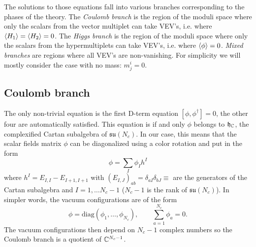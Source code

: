     The solutions to those equations fall into various branches corresponding to the phases of the theory. The \emph{Coulomb branch} is the region of the moduli space where only the scalars from the vector multiplet can take VEV's, i.e. where $\langle H_1\rangle=\langle H_2\rangle=0$. The \emph{Higgs branch} is the region of the moduli space where only the scalars from the hypermultiplets can take VEV's, i.e. where $\langle\phi\rangle=0$. \emph{Mixed branches} are regions where all VEV's are non-vanishing. For simplicity we will mostly consider the case with no mass: $m^i_j=0$.

    \subsection{Coulomb branch}

        The only non-trivial equation is the first D-term equation $[\phi,\phi^\dagger]=0$, the other four are automatically satisfied. This equation is if and only $\phi$ belongs to $\mathfrak{h}_{\mathbb{C}}$, the complexified Cartan subalgebra of $\mathfrak{su}(N_c)$. In our case, this means that the scalar fields matrix $\phi$ can be diagonalized using a color rotation and put in the form
        \begin{equation}
            \phi = \sum_I \phi_Ih^I
        \end{equation}
        where $h^I=E_{I,I}-E_{I+1,I+1}$ with $(E_{I,J})_{ab}=\delta_{aI}\delta_{bJ}\equiv$ are the generators of the Cartan subalgebra and $I=1,\dots N_c-1$ ($N_c-1$ is the rank of $\mathfrak{su}(N_c)$). In simpler words, the vacuum configurations are of the form
        \begin{equation}
            \phi=\text{diag}(\phi_1,\dots,\phi_{N_c}),\qquad \sum^{N_c}_{a=1}\phi_a=0.\label{eq:diagform}
        \end{equation}
        The vacuum configurations then depend on $N_c-1$ complex numbers so the Coulomb branch is a quotient of $\mathbb{C}^{N_c-1}$.
        
